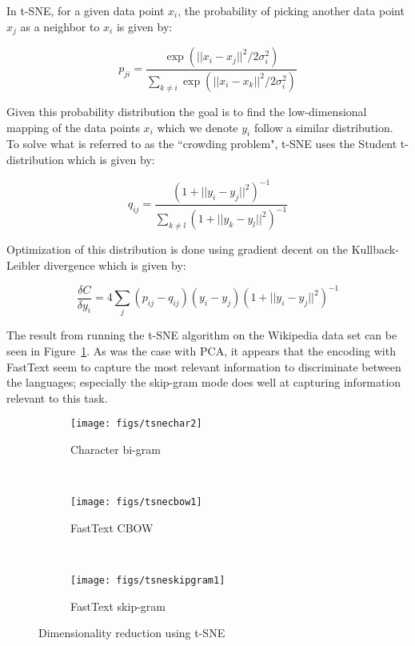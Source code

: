 \documentclass[11pt,a4paper]{article}
\begin{document}
In t-SNE, for a given data point $x_i$, the probability of picking another data point $x_j$ as a neighbor to $x_i$ is given by:

\begin{equation}
p_{ji}= \frac{\exp (|| x_i - x_j ||^2/2\sigma_i^2 )}{\sum_{k\neq i} \exp (|| x_i - x_k ||^2/2\sigma_i^2 )}
\end{equation}

Given this probability distribution the goal is to find the low-dimensional mapping of the data points $x_i$ which we denote $y_i$ follow a similar distribution. To solve what is referred to as the ``crowding problem", t-SNE uses the Student t-distribution which is given by:

\begin{equation}
q_{ij}= \frac{ (1+|| y_i - y_j ||^2 )^{-1}}{\sum_{k\neq l} (1+|| y_k - y_l ||^2 )^{-1}}
\end{equation}

Optimization of this distribution is done using gradient decent on the Kullback-Leibler divergence which is given by:

\begin{equation}
\frac{\delta C}{\delta y_i}= 4 \sum_j (p_{ij} - q_{ij})(y_i-y_j)(1+ || y_i - y_j ||^2  )^{-1}
\end{equation}

The result from running the t-SNE algorithm on the Wikipedia data set can be seen in Figure~\ref{tsne}. As was the case with PCA,  it appears that the encoding with FastText seem to capture the most relevant information to discriminate between the languages; especially the skip-gram mode does well at capturing information relevant to this task.

\begin{figure}
    \centering
    \begin{subfigure}[b]{0.47\textwidth}
        \texttt{[image: figs/tsnechar2]}
        \caption{Character bi-gram}
    \end{subfigure}
    ~
    \begin{subfigure}[b]{0.47\textwidth}
        \texttt{[image: figs/tsnecbow1]}
        \caption{FastText CBOW}
    \end{subfigure}
    ~
    \begin{subfigure}[b]{0.47\textwidth}
        \texttt{[image: figs/tsneskipgram1]}
        \caption{FastText skip-gram}
    \end{subfigure}
    \caption{Dimensionality reduction using t-SNE}
    \label{tsne}
\end{figure}
\end{document}
